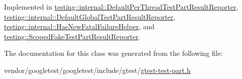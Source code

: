 Implemented in \hyperlink{classtesting_1_1internal_1_1_default_per_thread_test_part_result_reporter_ac6dc08eadc4e5a2a64a91d0b6c6b3aad}{testing\+::internal\+::\+Default\+Per\+Thread\+Test\+Part\+Result\+Reporter}, \hyperlink{classtesting_1_1internal_1_1_default_global_test_part_result_reporter_a6081576a23b964cfecab1e424d8044fc}{testing\+::internal\+::\+Default\+Global\+Test\+Part\+Result\+Reporter}, \hyperlink{classtesting_1_1internal_1_1_has_new_fatal_failure_helper_a2d2e1faa1f3669b82810df97ac678a27}{testing\+::internal\+::\+Has\+New\+Fatal\+Failure\+Helper}, and \hyperlink{classtesting_1_1_scoped_fake_test_part_result_reporter_a82531434f51632d98ed7cdcdb10b8b92}{testing\+::\+Scoped\+Fake\+Test\+Part\+Result\+Reporter}.



The documentation for this class was generated from the following file\+:\begin{DoxyCompactItemize}
\item 
vendor/googletest/googletest/include/gtest/\hyperlink{gtest-test-part_8h}{gtest-\/test-\/part.\+h}\end{DoxyCompactItemize}
